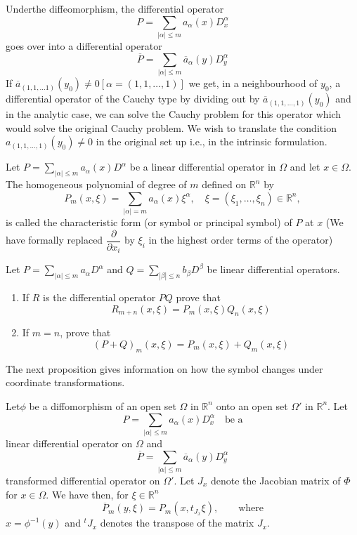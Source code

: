 Under\pageoriginale the diffeomorphism, the differential operator
$$
P=\sum\limits_{|\alpha|\leq m}a_{\alpha}(x)D^{\alpha}_{x}
$$
goes over into a differential operator
$$
\overline{P}=\sum\limits_{|\alpha|\leq m}\overline{a}_{\alpha}(y)D^{\alpha}_{y}
$$
If $\overline{a}_{(1,1,\ldots 1)}(y_{0})\neq 0[\alpha = (1,1,\ldots,1)]$ we get, in a neighbourhood of $y_{0}$, a differential operator of the Cauchy type by dividing out by $\overline{a}_{(1,1,\ldots,1)}(y_{0})$ and in the analytic case, we can solve the Cauchy problem for this operator which would solve the original Cauchy problem. We wish to translate the condition $a_{(1,1,\ldots,1)}(y_{0})\neq 0$ in the original set up i.e., in the intrinsic formulation.

\begin{defi*}
Let $P=\sum\limits_{|\alpha|\leq m}a_{\alpha}(x)D^{\alpha}$ be a linear differential operator in $\Omega$ and let $x\in \Omega$. The homogeneous polynomial of degree of $m$ defined on $\mathbb{R}^{n}$ by
$$
P_{m}(x,\xi)=\sum\limits_{|\alpha|=m}a_{\alpha}(x)\xi^{\alpha},\quad \xi=(\xi_{1},\ldots,\xi_{n})\in \mathbb{R}^{n},
$$
is called the characteristic form (or symbol or principal symbol) of $P$ at $x$ (We have formally replaced $\dfrac{\partial}{\partial x_{i}}$ by $\xi_{i}$ in the highest order terms of the operator)
\end{defi*}

\begin{exer*}
Let $P=\sum\limits_{|\alpha|\leq m}a_{\alpha}D^{\alpha}$ and $Q=\sum\limits_{|\beta|\leq n}b_{\beta}D^{\beta}$ be linear differential operators.
\begin{enumerate}
\renewcommand{\labelenumi}{(\theenumi)}
\item If $R$ is the differential operator $PQ$ prove that
$$
R_{m+n}(x,\xi)=P_{m}(x,\xi)Q_{n}(x,\xi)
$$

\item If $m=n$, prove that
$$
(P+Q)_{m}(x,\xi)=P_{m}(x,\xi)+Q_{m}(x,\xi)
$$
\end{enumerate}
\end{exer*}

The next proposition gives information on how the symbol changes under coordinate transformations.

\begin{prop*}
Let\pageoriginale $\phi$ be a diffomorphism of an open set $\Omega$ in $\mathbb{R}^{n}$ onto an open set $\Omega'$ in $\mathbb{R}^{n}$. Let
$$
P=\sum\limits_{|\alpha|\leq m}a_{\alpha}(x)D^{\alpha}_{x}\quad\text{be a}
$$
linear differential operator on $\Omega$ and
$$
\overline{P}=\sum\limits_{|\alpha|\leq m}\overline{a}_{\alpha}(y)D^{\alpha}_{y}
$$
transformed differential operator on $\Omega'$. Let $J_{x}$ denote the Jacobian matrix of $\Phi$ for $x\in \Omega$. We have then, for $\xi \in \mathbb{R}^{n}$
$$
\overline{P}_{m}(y,\xi)=P_{m}(x,t_{J_{x}}\xi),\qquad\text{where}
$$
$x=\phi^{-1}(y)$ and ${}^{t}J_{x}$ denotes the transpose of the matrix $J_{x}$.
\end{prop*}

